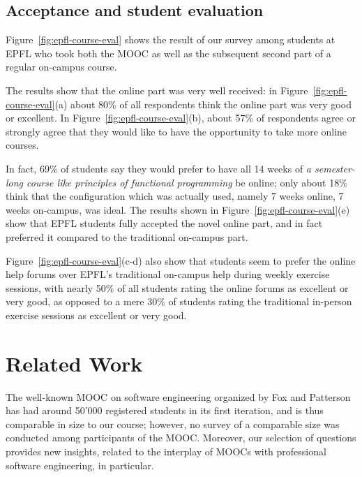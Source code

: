 \documentclass{sig-alternate}
\begin{document}
\subsection{Acceptance and student evaluation}

Figure~\ref{fig:epfl-course-eval} shows the result of our survey among
students at EPFL who took both the MOOC as well as the subsequent second part
of a regular on-campus course.

The results show that the online part was very
well received: in Figure~\ref{fig:epfl-course-eval}(a) about 80\% of all respondents
think the online part was very good or excellent.
In Figure~\ref{fig:epfl-course-eval}(b), about 57\% of respondents agree or strongly
agree that they would like to have the opportunity to take more online courses.

In fact, 69\% of students say they would prefer to
have all 14 weeks of {\em a semester-long course like principles of functional programming}
be online; only about 18\% think that the configuration which was actually used,
namely 7 weeks online, 7 weeks on-campus, was ideal. The results shown in
Figure~\ref{fig:epfl-course-eval}(e) show that EPFL students fully accepted the novel
online part, and in fact preferred it compared to the traditional on-campus part.

Figure~\ref{fig:epfl-course-eval}(c-d) also show that students seem to prefer the online
help forums over EPFL's traditional on-campus help during weekly exercise sessions, with
nearly 50\% of all students rating the online forums as excellent or very good, as opposed
to a mere 30\% of students rating the traditional in-person exercise sessions as excellent
or very good.



\section{Related Work}
\label{sec:related-work}

The well-known MOOC on software engineering organized by Fox and
Patterson~\cite{FoxP12} has had around 50'000 registered students in its first
iteration, and is thus comparable in size to our course; however, no survey of
a comparable size was conducted among participants of the MOOC. Moreover, our
selection of questions provides new insights, related to the interplay of
MOOCs with professional software engineering, in particular.
\end{document}
